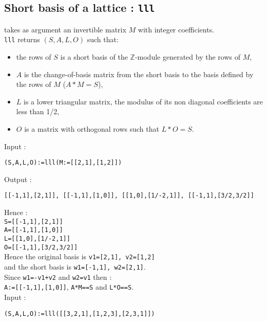 \documentclass[a4paper,11pt]{book}
\begin{document}
\subsection{Short basis of a lattice : {\tt lll}}
 takes as argument an invertible matrix $M$ with
integer coefficients.\\
{\tt lll} returns $(S,A,L,O)$ such that:
\begin{itemize}
\item the rows of $S$ is a short basis of the $\mathbb Z$-module 
generated by the rows of $M$,
\item $A$ is the change-of-basis matrix from the short basis to the basis 
defined by the rows of $M$ ($A*M=S$),
\item $L$ is a lower triangular matrix, the modulus of its non diagonal
coefficients are less than 1/2,
\item $O$ is a matrix with orthogonal rows such that $L*O=S$.
\end{itemize}
Input :
\begin{center}{\tt (S,A,L,O):=lll(M:=[[2,1],[1,2]])}\end{center}
Output :
\begin{center}{\tt [[-1,1],[2,1]], [[-1,1],[1,0]], [[1,0],[1/-2,1]], [[-1,1],[3/2,3/2]]}\end{center}
Hence :\\
{\tt S=[[-1,1],[2,1]]}\\
{\tt A=[[-1,1],[1,0]]}\\
{\tt L=[[1,0],[1/-2,1]]}\\
{\tt O=[[-1,1],[3/2,3/2]]}\\
Hence the original basis is {\tt v1=[2,1], v2=[1,2]}\\
and the short basis is {\tt w1=[-1,1], w2=[2,1]}.\\
Since {\tt w1=-v1+v2} and {\tt w2=v1} then :\\
{\tt A:=[[-1,1],[1,0]]}, {\tt A*M==S} and {\tt L*O==S}.\\
Input :
\begin{center}{\tt (S,A,L,O):=lll([[3,2,1],[1,2,3],[2,3,1]])}\end{center}
\end{document}
